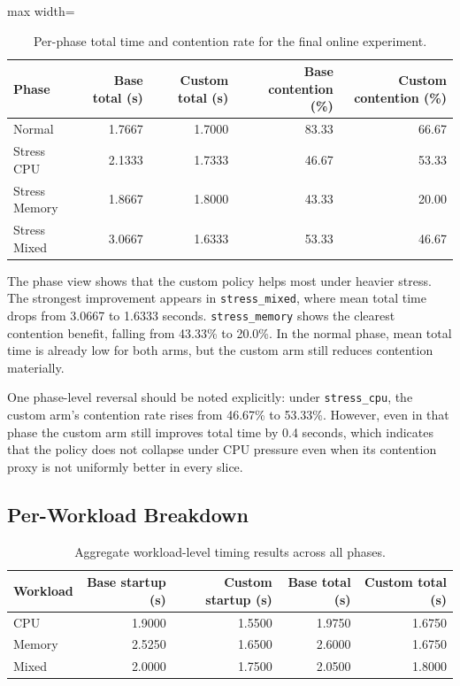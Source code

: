 \begin{table}[h]
\centering
\small
\begin{adjustbox}{max width=\textwidth}
\begin{tabular}{lrrrr}
\hline
\textbf{Phase} & \textbf{Base total (s)} & \textbf{Custom total (s)} & \textbf{Base contention (\%)} & \textbf{Custom contention (\%)} \\
\hline
Normal & 1.7667 & 1.7000 & 83.33 & 66.67 \\
Stress CPU & 2.1333 & 1.7333 & 46.67 & 53.33 \\
Stress Memory & 1.8667 & 1.8000 & 43.33 & 20.00 \\
Stress Mixed & 3.0667 & 1.6333 & 53.33 & 46.67 \\
\hline
\end{tabular}
\end{adjustbox}
\caption{Per-phase total time and contention rate for the final online experiment.}
\label{tab:ch4-phase-results}
\end{table}

The phase view shows that the custom policy helps most under heavier stress. The strongest improvement appears in \texttt{stress\_mixed}, where mean total time drops from 3.0667 to 1.6333 seconds. \texttt{stress\_memory} shows the clearest contention benefit, falling from 43.33\% to 20.0\%. In the normal phase, mean total time is already low for both arms, but the custom arm still reduces contention materially.

One phase-level reversal should be noted explicitly: under \texttt{stress\_cpu}, the custom arm's contention rate rises from 46.67\% to 53.33\%. However, even in that phase the custom arm still improves total time by 0.4 seconds, which indicates that the policy does not collapse under CPU pressure even when its contention proxy is not uniformly better in every slice.


\subsection{Per-Workload Breakdown}

\begin{table}[h]
\centering
\small
\begin{tabular}{lrrrr}
\hline
\textbf{Workload} & \textbf{Base startup (s)} & \textbf{Custom startup (s)} & \textbf{Base total (s)} & \textbf{Custom total (s)} \\
\hline
CPU & 1.9000 & 1.5500 & 1.9750 & 1.6750 \\
Memory & 2.5250 & 1.6500 & 2.6000 & 1.6750 \\
Mixed & 2.0000 & 1.7500 & 2.0500 & 1.8000 \\
\hline
\end{tabular}
\caption{Aggregate workload-level timing results across all phases.}
\label{tab:ch4-workload-results}
\end{table}

